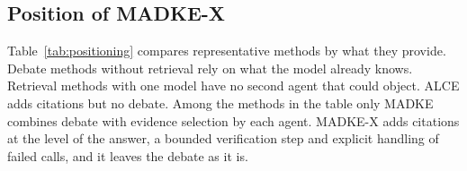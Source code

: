 \subsection{Position of MADKE-X}
Table~\ref{tab:positioning} compares representative methods by what they provide. Debate methods without retrieval rely on what the model already knows. Retrieval methods with one model have no second agent that could object. ALCE adds citations but no debate. Among the methods in the table only MADKE combines debate with evidence selection by each agent. MADKE-X adds citations at the level of the answer, a bounded verification step and explicit handling of failed calls, and it leaves the debate as it is.

\begin{table}[!htbp]
\centering
\small
\caption{Capabilities of representative methods (\checkmark{} = provided by the method as published).}
\label{tab:positioning}
\setlength{\tabcolsep}{4pt}
\end{table}
